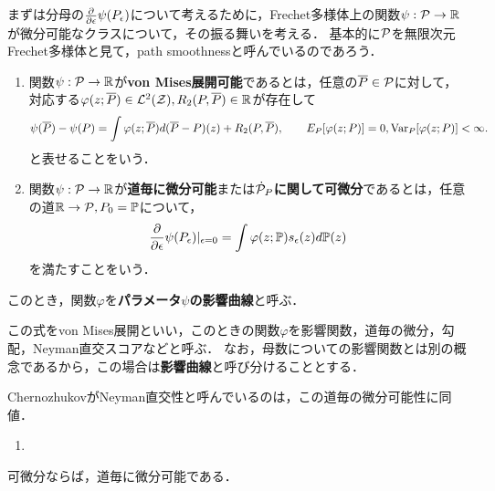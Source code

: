 \documentclass[uplatex,dvipdfmx]{jsreport}
\begin{document}
\begin{tcolorbox}[colframe=ForestGreen, colback=ForestGreen!10!white,breakable,colbacktitle=ForestGreen!40!white,coltitle=black,fonttitle=\bfseries\sffamily,
title=]
    まずは分母の$\pp{}{\ep}\psi(P_\ep)$について考えるために，Frechet多様体上の関数$\psi:\P\to\R$が微分可能なクラスについて，その振る舞いを考える．
    基本的に$\P$を無限次元Frechet多様体と見て，path smoothnessと呼んでいるのであろう．
\end{tcolorbox}

\begin{definition}\mbox{}
    \begin{enumerate}
        \item 関数$\psi:\P\to\R$が\textbf{von Mises展開可能}であるとは，任意の$\o{P}\in\P$に対して，対応する$\varphi(z;\o{P})\in\L^2(\cZ),R_2(P,\o{P})\in\R$が存在して
        \[\psi(\o{P})-\psi(P)=\int\varphi(z;\o{P})d(\o{P}-P)(z)+R_2(P,\o{P}),\qquad E_P[\varphi(z;P)]=0,\Var_P[\varphi(z;P)]<\infty.\]
        と表せることをいう．
        \item 関数$\psi:\P\to\R$が\textbf{道毎に微分可能}または\textbf{$\dot{\P}_P$に関して可微分}であるとは，任意の道$\R\to\P,P_0=\bP$について，
        \[\pp{}{\ep}\psi(P_\ep)|_{\ep=0}=\int\varphi(z;\bP)s_\ep(z)d\bP(z)\]
        を満たすことをいう．
    \end{enumerate}
    このとき，関数$\varphi$を\textbf{パラメータ$\psi$の影響曲線}と呼ぶ．
\end{definition}
\begin{remark}
    この式をvon Mises展開といい，このときの関数$\varphi$を影響関数，道毎の微分，勾配，Neyman直交スコアなどと呼ぶ．
    なお，母数についての影響関数とは別の概念であるから，この場合は\textbf{影響曲線}と呼び分けることとする．

    ChernozhukovがNeyman直交性と呼んでいるのは，この道毎の微分可能性に同値．
\end{remark}

\begin{example}[道毎に微分可能な汎関数]\mbox{}
    \begin{enumerate}
        \item 
    \end{enumerate}
\end{example}

\begin{lemma}
    可微分ならば，道毎に微分可能である．
\end{lemma}
\end{document}
